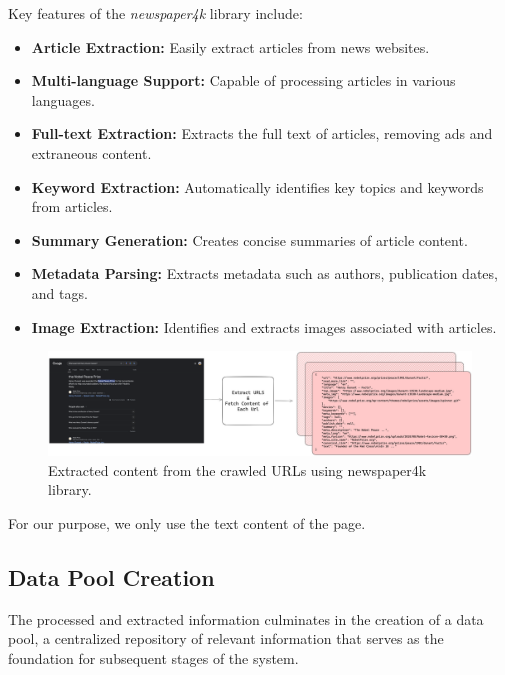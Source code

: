 Key features of the \textit{newspaper4k} library include:
\begin{itemize}
    \item \textbf{Article Extraction:} Easily extract articles from news websites.
    \item \textbf{Multi-language Support:} Capable of processing articles in various languages.
    \item \textbf{Full-text Extraction:} Extracts the full text of articles, removing ads and extraneous content.
    \item \textbf{Keyword Extraction:} Automatically identifies key topics and keywords from articles.
    \item \textbf{Summary Generation:} Creates concise summaries of article content.
    \item \textbf{Metadata Parsing:} Extracts metadata such as authors, publication dates, and tags.
    \item \textbf{Image Extraction:} Identifies and extracts images associated with articles.
\end{itemize}

\begin{figure}[ht!]
    \centering
    \begin{minipage}[b]{\textwidth}
        \centering
        \includegraphics[width=\textwidth]{res/Google-Search-Result-Content}
    \end{minipage}
    \caption{Extracted content from the crawled URLs using newspaper4k library.}
    \label{fig:google-search-result-content}
\end{figure}

For our purpose, we only use the text content of the page.
\subsection{Data Pool Creation}\label{subsec:data-pool-creation}
The processed and extracted information culminates in the creation of a data pool, a centralized repository of relevant information that serves as the foundation for subsequent stages of the system.

